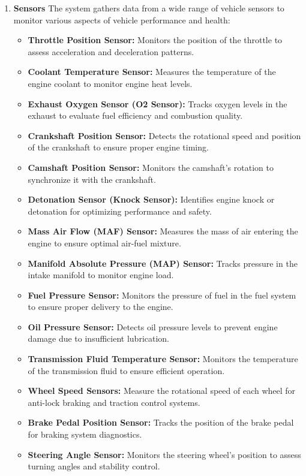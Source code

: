 \begin{enumerate}
    \item \textbf{Sensors} The system gathers data from a wide range of vehicle sensors to monitor various aspects of vehicle performance and health:
    \begin{itemize}
        \item \textbf{Throttle Position Sensor:} Monitors the position of the throttle to assess acceleration and deceleration patterns.
        \item \textbf{Coolant Temperature Sensor:} Measures the temperature of the engine coolant to monitor engine heat levels.
        \item \textbf{Exhaust Oxygen Sensor (O2 Sensor):} Tracks oxygen levels in the exhaust to evaluate fuel efficiency and combustion quality.
        \item \textbf{Crankshaft Position Sensor:} Detects the rotational speed and position of the crankshaft to ensure proper engine timing.
        \item \textbf{Camshaft Position Sensor:} Monitors the camshaft's rotation to synchronize it with the crankshaft.
        \item \textbf{Detonation Sensor (Knock Sensor):} Identifies engine knock or detonation for optimizing performance and safety.
        \item \textbf{Mass Air Flow (MAF) Sensor:} Measures the mass of air entering the engine to ensure optimal air-fuel mixture.
        \item \textbf{Manifold Absolute Pressure (MAP) Sensor:} Tracks pressure in the intake manifold to monitor engine load.
        \item \textbf{Fuel Pressure Sensor:} Monitors the pressure of fuel in the fuel system to ensure proper delivery to the engine.
        \item \textbf{Oil Pressure Sensor:} Detects oil pressure levels to prevent engine damage due to insufficient lubrication.
        \item \textbf{Transmission Fluid Temperature Sensor:} Monitors the temperature of the transmission fluid to ensure efficient operation.
        \item \textbf{Wheel Speed Sensors:} Measure the rotational speed of each wheel for anti-lock braking and traction control systems.
        \item \textbf{Brake Pedal Position Sensor:} Tracks the position of the brake pedal for braking system diagnostics.
        \item \textbf{Steering Angle Sensor:} Monitors the steering wheel’s position to assess turning angles and stability control.

\end{itemize}
\end{enumerate}
